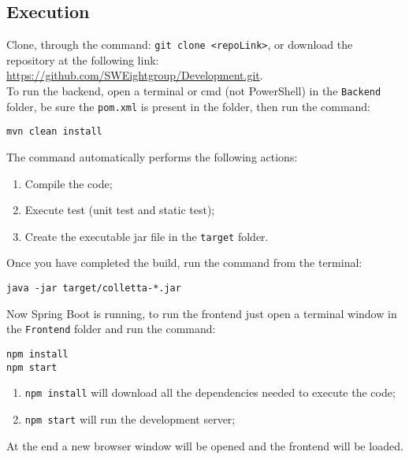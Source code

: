 \subsection{Execution}
Clone, through the command: \texttt{git clone <repoLink>}, or download the repository at the following link: \url{https://github.com/SWEightgroup/Development.git}.\\
To run the backend, open a terminal or cmd (not PowerShell) in the \texttt{Backend} folder, be sure the \texttt{pom.xml} is present in the folder, then run the command: 
\begin{center}
\texttt{mvn clean install}
\end{center} 
The command automatically performs the following actions:
\begin{enumerate}
\item Compile the code;
\item Execute test (unit test and static test);
\item Create the executable jar file in the \texttt{target} folder.
\end{enumerate}
Once you have completed the build, run the command from the terminal:\\
\begin{center}
\texttt{java -jar target/colletta-*.jar}
\end{center}
Now Spring Boot is running, to run the frontend just open a terminal window in the \texttt{Frontend} folder and run the command: 
\begin{center}
\texttt{npm install}
\\
\texttt{npm start}
\end{center}
\begin{enumerate}
\item \texttt{npm install} will download all the dependencies needed to execute the code;
\item \texttt{npm start} will run the development server; 
\end{enumerate}
At the end a new browser window will be opened and the frontend will be loaded.

